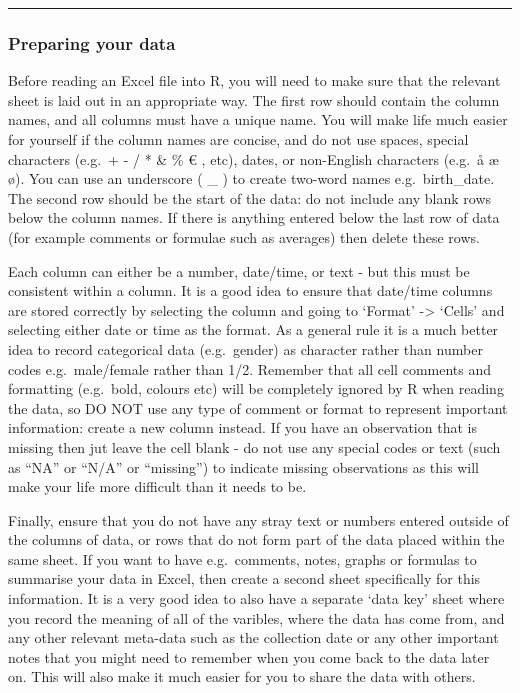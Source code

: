 \documentclass[
]{article}
\begin{document}
\begin{center}\rule{0.5\linewidth}{0.5pt}\end{center}

\hypertarget{preparing-your-data}{%
\subsubsection{Preparing your data}\label{preparing-your-data}}

Before reading an Excel file into R, you will need to make sure that the
relevant sheet is laid out in an appropriate way. The first row should
contain the column names, and all columns must have a unique name. You
will make life much easier for yourself if the column names are concise,
and do not use spaces, special characters (e.g.~+ - / * \& \% € , etc),
dates, or non-English characters (e.g.~å æ ø). You can use an underscore
( \_ ) to create two-word names e.g.~birth\_date. The second row should
be the start of the data: do not include any blank rows below the column
names. If there is anything entered below the last row of data (for
example comments or formulae such as averages) then delete these rows.

Each column can either be a number, date/time, or text - but this must
be consistent within a column. It is a good idea to ensure that
date/time columns are stored correctly by selecting the column and going
to `Format' -\textgreater{} `Cells' and selecting either date or time as
the format. As a general rule it is a much better idea to record
categorical data (e.g.~gender) as character rather than number codes
e.g.~male/female rather than 1/2. Remember that all cell comments and
formatting (e.g.~bold, colours etc) will be completely ignored by R when
reading the data, so DO NOT use any type of comment or format to
represent important information: create a new column instead. If you
have an observation that is missing then jut leave the cell blank - do
not use any special codes or text (such as ``NA'' or ``N/A'' or
``missing'') to indicate missing observations as this will make your
life more difficult than it needs to be.

Finally, ensure that you do not have any stray text or numbers entered
outside of the columns of data, or rows that do not form part of the
data placed within the same sheet. If you want to have e.g.~comments,
notes, graphs or formulas to summarise your data in Excel, then create a
second sheet specifically for this information. It is a very good idea
to also have a separate `data key' sheet where you record the meaning of
all of the varibles, where the data has come from, and any other
relevant meta-data such as the collection date or any other important
notes that you might need to remember when you come back to the data
later on. This will also make it much easier for you to share the data
with others.
\end{document}
